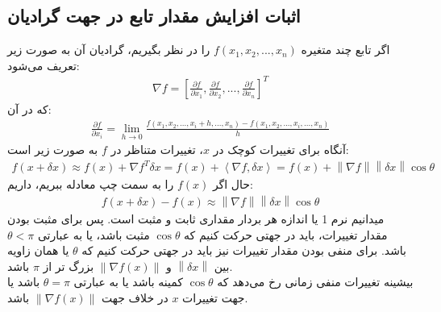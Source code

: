 \documentclass[fleqn]{article}
\theoremstyle{definition}
\begin{document}
\subsection{ﺍﺛﺒﺎﺕ ﺍﻓﺰﺍﯾﺶ ﻣﻘﺪﺍﺭ ﺗﺎﺑﻊ ﺩﺭ ﺟﻬﺖ گرﺍﺩﯾﺎﻥ}
اگر تابع چند متغیره $f(x_1,x_2,...,x_n)$ را در نظر بگیریم، گرادیان آن به صورت زیر تعریف می‌شود:\\
\begin{gather*}
    \nabla f = \left[\frac{\partial f}{\partial x_1},\frac{\partial f}{\partial x_2},...,\frac{\partial f}{\partial x_n}\right]^T
\end{gather*}
که در آن: \\
\begin{gather*}
    \frac{\partial f}{\partial x_i} = \lim_{h \to 0} \frac{f(x_1,x_2,...,x_i+h,...,x_n) - f(x_1,x_2,...,x_i,...,x_n)}{h}
\end{gather*}
آنگاه برای تغییرات کوچک در $x$، تغییرات متناظر در $f$ به صورت زیر است:\\
\begin{gather*}
    f(x + \delta x) \approx f(x) + \nabla f^T \delta x = f(x) + \left\langle \nabla f, \delta x \right\rangle = f(x) + \left\| \nabla f \right\| \left\| \delta x \right\| \cos \theta
\end{gather*}
حال اگر $f(x)$ را به سمت چپ معادله ببریم، داریم:
\begin{gather*}
    f(x + \delta x) - f(x) \approx \left\| \nabla f \right\| \left\| \delta x \right\| \cos \theta
\end{gather*}
میدانیم نرم 1 یا اندازه هر بردار مقداری ثابت و مثبت است.  پس برای مثبت بودن مقدار تغییرات، باید در جهتی حرکت کنیم که $\cos \theta$ مثبت باشد، یا به عبارتی $\theta < \pi$ باشد. برای منفی بودن مقدار تغییرات نیز باید در جهتی حرکت کنیم که $\theta$ یا همان زاویه بین $\left\| \delta x \right\|$ و $\left\| \nabla f(x) \right\|$ بزرگ تر از $\pi$ باشد.\\
بیشینه تغییرات منفی زمانی رخ می‌دهد که $\cos \theta$ کمینه باشد یا به عبارتی $\theta = \pi$ باشد یا جهت تغییرات $x$ در خلاف جهت $\left\| \nabla f(x) \right\|$ باشد.
\end{document}
